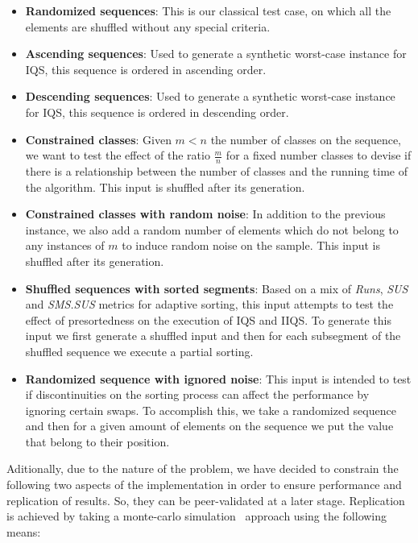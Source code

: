 \begin{itemize}
        
    \item{\textbf{Randomized sequences}: 
    This is our classical test case, on which all the elements are shuffled without any special criteria.}

    \item{\textbf{Ascending sequences}: 
    Used to generate a synthetic worst-case instance for IQS, this sequence is ordered in ascending order.}

    \item{\textbf{Descending sequences}: 
    Used to generate a synthetic worst-case instance for IQS, this sequence is ordered in descending order.}

    \item{\textbf{Constrained classes}: 
    Given $m < n$ the number of classes on the sequence, we want to test the effect of the ratio $\frac{m}{n}$ for a fixed number classes to devise if there is a relationship between the number of classes and the running time of the algorithm. This input is shuffled after its generation.}

    \item{\textbf{Constrained classes with random noise}: 
    In addition to the previous instance, we also add a random number of elements which do not belong to any instances of $m$ to induce random noise on the sample. This input is shuffled after its generation.}

    \item{\textbf{Shuffled sequences with sorted segments}: 
    Based on a mix of \textit{Runs}, \textit{SUS} and \textit{SMS.SUS} metrics for adaptive sorting, this input attempts to test the effect of presortedness on the execution of IQS and IIQS. To generate this input we first generate a shuffled input and then for each subsegment of the shuffled sequence we execute a partial sorting.}

    \item{\textbf{Randomized sequence with ignored noise}: 
    This input is intended to test if discontinuities on the sorting process can affect the performance by ignoring certain swaps. To accomplish this, we take a randomized sequence and then for a given amount of elements on the sequence we put the value that belong to their position.}
\end{itemize}

Aditionally, due to the nature of the problem, we have decided to constrain the following two aspects of the implementation in order to ensure performance and replication of results. So, they can be peer-validated at a later stage. Replication is achieved by taking a monte-carlo simulation~\cite{10.5555/1614191} approach using the following means:\\

